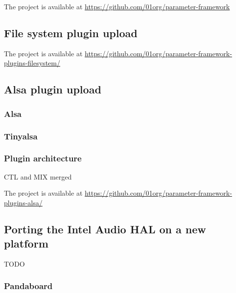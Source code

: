 The project is available at \url{https://github.com/01org/parameter-framework}

\subsection{File system plugin upload}

The project is available at \url{https://github.com/01org/parameter-framework-plugins-filesystem/}

\subsection{Alsa plugin upload}
\subsubsection{Alsa}
\subsubsection{Tinyalsa}
\subsubsection{Plugin architecture}
CTL and MIX merged

The project is available at \url{https://github.com/01org/parameter-framework-plugins-alsa/}


\subsection{Porting the Intel Audio HAL on a new platform}
TODO
\subsubsection{Pandaboard}

